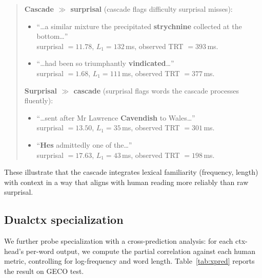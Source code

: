\documentclass[11pt]{article}
\begin{document}
\begin{quote}\small
\textbf{Cascade $\gg$ surprisal} (cascade flags difficulty surprisal misses):
\begin{itemize}\setlength\itemsep{-2pt}
\item ``\dots a similar mixture the precipitated \textbf{strychnine} collected at the bottom\dots'' \\
      surprisal $= 11.78$, $L_1 = 132$\,ms, observed TRT $= 393$\,ms.
\item ``\dots had been so triumphantly \textbf{vindicated}\dots'' \\
      surprisal $= 1.68$, $L_1 = 111$\,ms, observed TRT $= 377$\,ms.
\end{itemize}

\textbf{Surprisal $\gg$ cascade} (surprisal flags words the cascade processes fluently):
\begin{itemize}\setlength\itemsep{-2pt}
\item ``\dots sent after Mr Lawrence \textbf{Cavendish} to Wales\dots'' \\
      surprisal $= 13.50$, $L_1 = 35$\,ms, observed TRT $= 301$\,ms.
\item ``\textbf{Hes} admittedly one of the\dots'' \\
      surprisal $= 17.63$, $L_1 = 43$\,ms, observed TRT $= 198$\,ms.
\end{itemize}
\end{quote}

These illustrate that the cascade integrates lexical familiarity (frequency, length) with context in a way that aligns with human reading more reliably than raw surprisal.

\subsection{Dualctx specialization}\label{sec:dualctx}

We further probe specialization with a cross-prediction analysis: for each ctx-head's per-word output, we compute the partial correlation against each human metric, controlling for log-frequency and word length. Table~\ref{tab:xpred} reports the result on GECO test.
\end{document}
